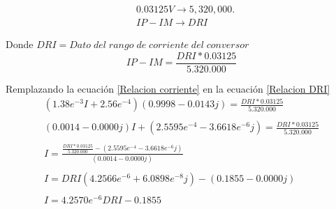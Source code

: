     \begin{align*}
        &0.03125V \rightarrow 5,320,000.\\
        &IP-IM \rightarrow DRI
    \end{align*}
    
    Donde $DRI = Dato\;del\;rango\;de\;corriente\;del\;conversor$\\
    
    \begin{equation}\label{Relacion DRI}
        IP-IM = \frac{DRI * 0.03125}{5.320.000}
    \end{equation}
    
    Remplazando la ecuación \ref{Relacion corriente} en la ecuación \ref{Relacion DRI}
    \begin{align*}
        (1.38e^{-3} I + 2.56e^{-4})(0.9998 - 0.0143j) = \frac{DRI * 0.03125}{5.320.000} \\\\
        (0.0014 - 0.0000j)I + (2.5595e^{-4} - 3.6618e^{-6}j)  = \frac{DRI * 0.03125}{5.320.000} \\\\
        I = \frac{\frac{DRI * 0.03125}{5.320.000} - (2.5595e^{-4} - 3.6618e^{-6}j)}{(0.0014 - 0.0000j)}  \\\\
        I = DRI (4.2566e^{-6} + 6.0898e^{-8}j) - (0.1855 - 0.0000j)   \\\\
        I = 4.2570e^{-6}DRI  - 0.1855   \\\\
    \end{align*}
